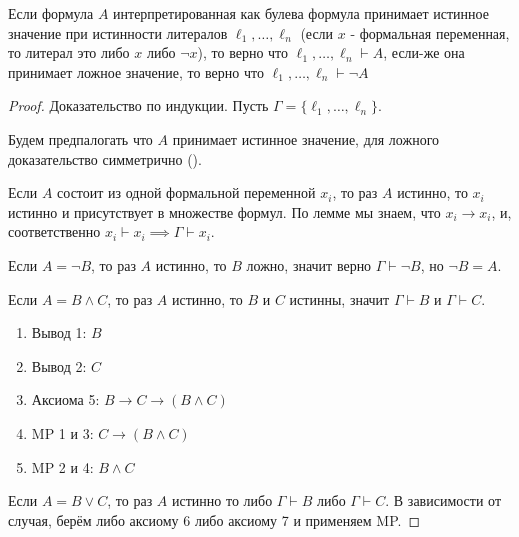 \begin{lemma} \thmslashn

    Если формула $A$ интерпретированная как булева формула принимает истинное значение при истинности литералов $\ell_1, \ldots, \ell_{n}$ (если $x$ - формальная переменная, то литерал это либо $x$ либо $\neg x$), то верно что $\ell_1, \ldots, \ell_{n} \vdash A$, если-же она принимает ложное значение, то верно что $\ell_1, \ldots, \ell_{n} \vdash \neg A$
    \begin{proof} \thmslashn
    
       Доказательство по индукции. Пусть $\Gamma = \{\ell_1, \ldots, \ell_{n}\} $.

       Будем предпалогать что $A$ принимает истинное значение, для ложного доказательство симметрично ().

       Если $A$ состоит из одной формальной переменной $x_{i}$, то раз $A$ истинно, то $x_{i}$ истинно и присутствует в множестве формул. По лемме мы знаем, что $x_{i} \to x_{i}$, и, соответственно $x_{i} \vdash x_{i} \implies \Gamma \vdash x_{i}$.

       Если $A = \neg B$, то раз $A$ истинно, то $B$ ложно, значит верно $\Gamma \vdash \neg B$, но $\neg B = A$.

       Если $A = B \land C$, то раз $A$ истинно, то $B$ и $C$ истинны, значит $\Gamma \vdash B$ и  $\Gamma \vdash C$. 
       \begin{enumerate}
           \item Вывод 1: $B$
           \item Вывод 2: $C$
           \item Аксиома 5: $B \to C \to (B \land C)$
           \item MP 1 и 3: $C \to (B \land C)$
           \item MP 2 и 4: $B \land C$
       \end{enumerate}

        Если $A = B \lor C$, то раз $A$ истинно то либо $\Gamma \vdash B$ либо $\Gamma \vdash C$. В зависимости от случая, берём либо аксиому 6 либо аксиому 7 и применяем MP.
    \end{proof}
\end{lemma}
